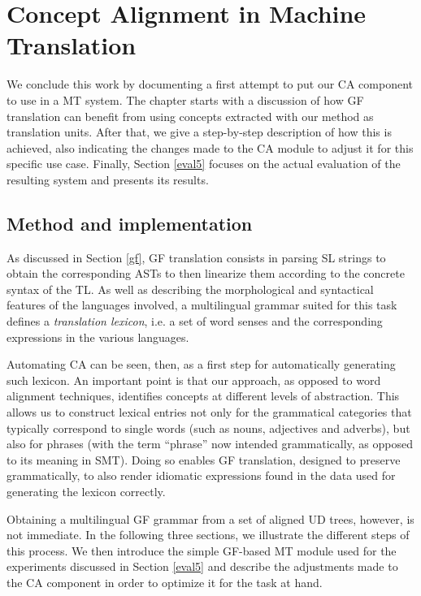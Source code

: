 \chapter{Concept Alignment in Machine Translation} \label{ch5}
We conclude this work by documenting a first attempt to put our CA component to use in a MT system. 
The chapter starts with a discussion of how GF translation can benefit from using concepts extracted with our method as translation units.
After that, we give a step-by-step description of how this is achieved, also indicating the changes made to the CA module to adjust it for this specific use case. 
Finally, Section \ref{eval5} focuses on the actual evaluation of the resulting system and presents its results.

\section{Method and implementation}
As discussed in Section \ref{gf}, GF translation consists in parsing SL strings to obtain the corresponding ASTs to then linearize them according to the concrete syntax of the TL.
As well as describing the morphological and syntactical features of the languages involved, a multilingual grammar suited for this task defines a \textit{translation lexicon}, i.e. a set of word senses and the corresponding expressions in the various languages. \smallskip

Automating CA can be seen, then, as a first step for automatically generating such lexicon. 
An important point is that our approach, as opposed to word alignment techniques, identifies concepts at different levels of abstraction.
This allows us to construct lexical entries not only for the grammatical categories that typically correspond to single words (such as nouns, adjectives and adverbs), but also for phrases (with the term ``phrase'' now intended grammatically, as opposed to its meaning in SMT).
Doing so enables GF translation, designed to preserve grammatically, to also render idiomatic expressions found in the data used for generating the lexicon correctly. \smallskip

Obtaining a multilingual GF grammar from a set of aligned UD trees, however, is not immediate. In the following three sections, we illustrate the different steps of this process. We then introduce the simple GF-based MT module used for the experiments discussed in Section \ref{eval5} and describe the adjustments made to the CA component in order to optimize it for the task at hand. 

